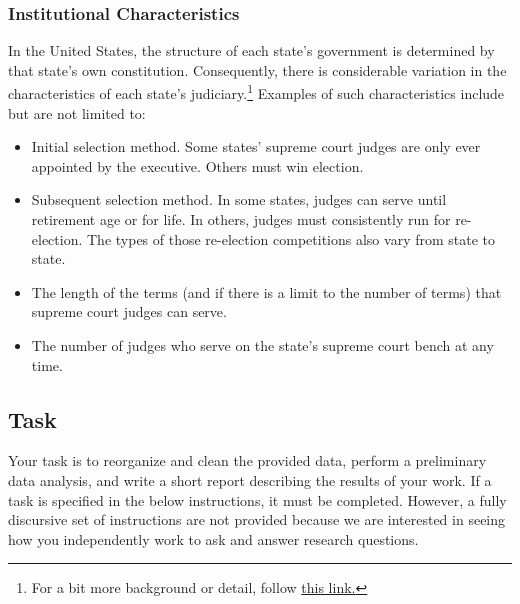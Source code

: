 \documentclass[11pt, letterpaper, twoside]{article}
\begin{document}
\subsubsection*{Institutional Characteristics}
In the United States, the structure of each state's government is determined by that state's own constitution. Consequently, there is considerable variation in the characteristics of each state's judiciary.\footnote{For a bit more background or detail, follow \href{https://www.brennancenter.org/judicial-selection-map}{this link.}} Examples of such characteristics include but are not limited to:
\begin{itemize}
    \item Initial selection method. Some states' supreme court judges are only ever appointed by the executive. Others must win election.
    \item Subsequent selection method. In some states, judges can serve until retirement age or for life. In others, judges must consistently run for re-election. The types of those re-election competitions also vary from state to state.
    \item The length of the terms (and if there is a limit to the number of terms) that supreme court judges can serve.
    \item The number of judges who serve on the state's supreme court bench at any time.
\end{itemize}

\subsection*{Task}

Your task is to reorganize and clean the provided data, perform a preliminary data analysis, and write a short report describing the results of your work. If a task is specified in the below instructions, it must be completed. However, a fully discursive set of instructions are not provided because we are interested in seeing how you independently work to ask and answer research questions.
\end{document}
